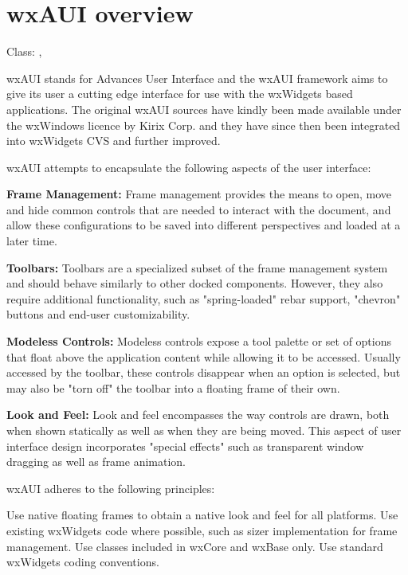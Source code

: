 \section{wxAUI overview}\label{wxauioverview}

Class: , 

wxAUI stands for Advances User Interface and the wxAUI framework
aims to give its user a cutting edge interface for use with the
wxWidgets based applications. The original wxAUI sources have
kindly been made available under the wxWindows licence
by Kirix Corp. and they have since then been integrated into
wxWidgets CVS and further improved.

wxAUI attempts to encapsulate the following aspects of the user interface:

{\bf Frame Management:}
Frame management provides the means to open, move and hide common
controls that are needed to interact with the document, and allow these
configurations to be saved into different perspectives and loaded at a
later time.

{\bf Toolbars:}
Toolbars are a specialized subset of the frame management system and
should behave similarly to other docked components. However, they also
require additional functionality, such as "spring-loaded" rebar support,
"chevron" buttons and end-user customizability.

{\bf Modeless Controls:}
Modeless controls expose a tool palette or set of options that float
above the application content while allowing it to be accessed. Usually
accessed by the toolbar, these controls disappear when an option is
selected, but may also be "torn off" the toolbar into a floating frame
of their own.

{\bf Look and Feel:}
Look and feel encompasses the way controls are drawn, both when shown
statically as well as when they are being moved. This aspect of user
interface design incorporates "special effects" such as transparent
window dragging as well as frame animation.

wxAUI adheres to the following principles:

Use native floating frames to obtain a native look and feel for all
platforms. Use existing wxWidgets code where possible, such as sizer
implementation for frame management. Use classes included in wxCore
and wxBase only. Use standard wxWidgets coding conventions. 

